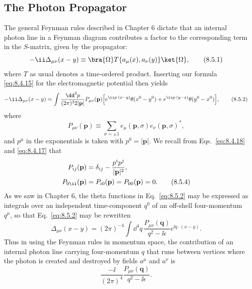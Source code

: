 
\subsection{The Photon Propagator}

The general Feynman rules described in Chapter 6 dictate that an internal
photon line in a Feynman diagram contributes a factor to the corresponding
term in the $S$-matrix, given by the propagator:
\begin{equation}
-\ii\Delta_{\mu\nu}(x-y)
\equiv\bra{\Omega}T\{a_\mu(x),a_\nu(y)\}\ket{\Omega},
\tag{8.5.1}\label{eq:8.5.1}
\end{equation}
where $T$ as usual denotes a time-ordered product. Inserting our formula
\eqref{eq:8.4.15} for the electromagnetic potential then yields
\begin{align}
-\ii\Delta_{\mu\nu}(x-y)
=\int\frac{\dd^3p}{(2\pi)^3 2\lvert\mathbf p\rvert}
P_{\mu\nu}(\mathbf p)\Bigl[
e^{\ii p\cdot(x-y)}\theta(x^0-y^0)
+e^{\ii p\cdot(y-x)}\theta(y^0-x^0)\Bigr],
\tag{8.5.2}\label{eq:8.5.2}
\end{align}
where
\begin{equation}
P_{\mu\nu}(\mathbf p)
\equiv\sum_{\sigma=\pm1}
e_\mu(\mathbf p,\sigma)e_\nu(\mathbf p,\sigma)^*,
\tag{8.5.3}\label{eq:8.5.3}
\end{equation}
and $p^\mu$ in the exponentials is taken with
$p^0=\lvert\mathbf p\rvert$. We recall from Eqs.~\eqref{eq:8.4.18} and \eqref{eq:8.4.17} that
\begin{align}
P_{ij}(\mathbf p)&=\delta_{ij}-\frac{p^i p^j}{\lvert\mathbf p\rvert^2},
\notag\\
P_{0\ii}(\mathbf p)&=P_{i0}(\mathbf p)=P_{00}(\mathbf p)=0.
\tag{8.5.4}\label{eq:8.5.4}
\end{align}
As we saw in Chapter 6, the theta functions in Eq.~\eqref{eq:8.5.2} may be expressed as
integrals over an independent time-component $q^0$ of an off-shell
four-momentum $q^\mu$, so that Eq.~\eqref{eq:8.5.2} may be rewritten
\begin{equation}
\Delta_{\mu\nu}(x-y)=(2\pi)^{-4}\int \dd^4q\,
\frac{P_{\mu\nu}(\mathbf q)}{q^2-\ii\epsilon}
e^{\ii q\cdot(x-y)}.
\tag{8.5.5}\label{eq:8.5.5}
\end{equation}
Thus in using the Feynman rules in momentum space, the contribution of an
internal photon line carrying four-momentum $q$ that runs between vertices
where the photon is created and destroyed by fields $a^\mu$ and $a^\nu$ is
\begin{equation}
\frac{-\ii}{(2\pi)^4}\frac{P_{\mu\nu}(\mathbf q)}{q^2-\ii\epsilon}.
\tag{8.5.6}\label{eq:8.5.6}
\end{equation}

